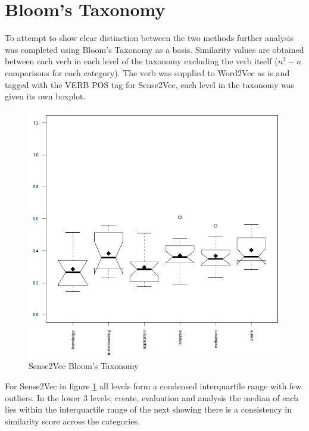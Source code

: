 \section{Bloom's Taxonomy}
To attempt to show clear distinction between the two methods further analysis was completed using Bloom's Taxonomy as a basis. Similarity values are obtained between each verb in each level of the taxonomy excluding the verb itself ($n^2-n$ comparisons for each category). The verb was supplied to Word2Vec as is and tagged with the VERB POS tag for Sense2Vec, each level in the taxonomy was given its own boxplot.

\begin{figure}[H]
\centering
  \includegraphics[width=\textwidth]{images/s2v_bloom.PNG}
  \caption{Sense2Vec Bloom's Taxonomy}
  \label{fig:bloom_s2v}
\end{figure}

\noindent
For Sense2Vec in figure \ref{fig:bloom_s2v} all levels form a condensed interquartile range with few outliers. In the lower 3 levels; create, evaluation and analysis the median of each lies within the interquartile range of the next showing there is a consistency in similarity score across the categories.

